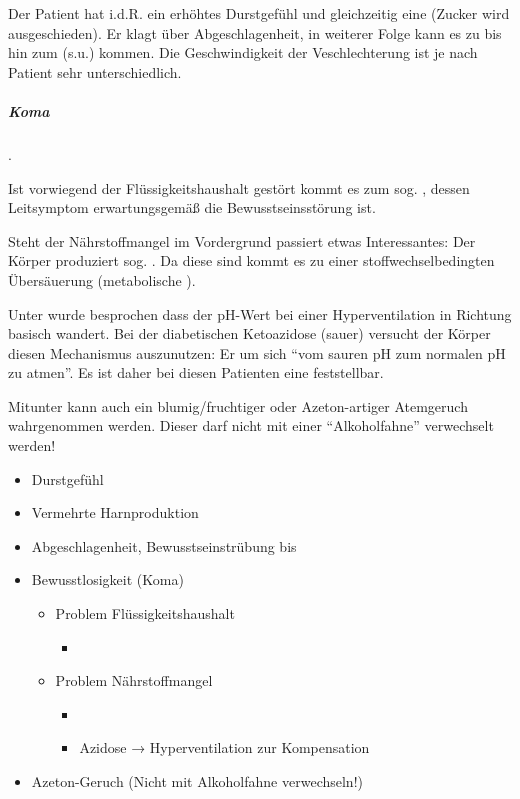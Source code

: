 {
Der Patient hat i.d.R. ein erhöhtes Durstgefühl und gleichzeitig eine
 (Zucker wird ausgeschieden). Er klagt über
Abgeschlagenheit, in weiterer Folge kann es zu  bis
hin zum  (s.u.) kommen. Die Geschwindigkeit der Veschlechterung ist je
nach Patient sehr unterschiedlich.

\subparagraph{Koma} \label{topic:koma-diabetisches}  . 

Ist vorwiegend der Flüssigkeitshaushalt gestört kommt es zum sog.
, dessen Leitsymptom erwartungsgemäß die
Bewusstseinsstörung ist.

Steht der Nährstoffmangel im Vordergrund passiert etwas Interessantes: Der
Körper produziert sog. . Da diese  sind kommt es zu
einer stoffwechselbedingten Übersäuerung (metabolische 
).

Unter  wurde besprochen dass der pH-Wert
bei einer Hyperventilation in Richtung basisch wandert. Bei der diabetischen
Ketoazidose (sauer) versucht der Körper diesen Mechanismus auszunutzen: Er  um sich "`vom sauren pH
    zum normalen pH zu atmen"'. Es ist daher bei diesen Patienten eine
     feststellbar.

Mitunter kann auch ein blumig/fruchtiger oder Azeton-artiger Atemgeruch
wahrgenommen werden. Dieser darf nicht mit einer "`Alkoholfahne"' verwechselt
werden! 
}{
\begin{itemize}
  \item Durstgefühl
  \item Vermehrte Harnproduktion
  \item Abgeschlagenheit, Bewusstseinstrübung bis
  \item Bewusstlosigkeit (Koma)
  \begin{itemize}
    \item Problem Flüssigkeitshaushalt
    \begin{itemize}
      \item {}
    \end{itemize}
    \item Problem Nährstoffmangel
    \begin{itemize}
      \item {}
      \item Azidose → Hyperventilation zur Kompensation
    \end{itemize}
  \end{itemize}
  \item Azeton-Geruch (Nicht mit Alkoholfahne verwechseln!)
\end{itemize}
}{}{}{}



